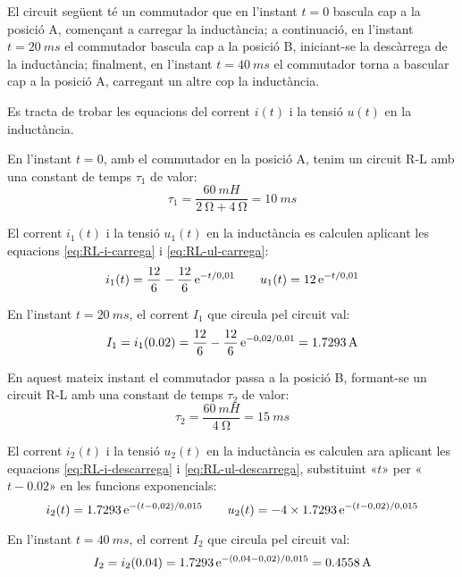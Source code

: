\break
\begin{exemple}\label{ex:carrega-descarrega-RL}
    El circuit següent té un commutador que en l'instant $t=0$ bascula cap a la posició A, començant a carregar la inductància; a continuació, en l'instant $t=\SI{20}{ms}$ el commutador bascula cap a la posició B, iniciant-se la descàrrega de la inductància; finalment, en  l'instant $t=\SI{40}{ms}$ el commutador torna a  bascular cap a la posició A, carregant un altre cop la inductància.

    Es tracta de trobar les equacions del corrent $i(t)$ i la tensió $u(t)$ en la inductància.

    \begin{center}
        
    \end{center}

    En l'instant $t=0$, amb el commutador en la posició A, tenim un circuit R-L amb una constant de temps $\tau_1$ de valor:
    \[
        \tau_1 = \frac{\SI{60}{mH}}{\SI{2}{\ohm}+\SI{4}{\ohm}} = \SI{10}{ms}
    \]

    El corrent $i_1(t)$ i la tensió $u_1(t)$ en la inductància es calculen aplicant les equacions \eqref{eq:RL-i-carrega} i \eqref{eq:RL-ul-carrega}:
    \[
        i_1(t) = \frac{12}{6} - \frac{12}{6}\,\mathrm{e}^{-t/0,01} \qquad
        u_1(t) = 12\,\mathrm{e}^{-t/0,01}
    \]

    En l'instant $t=\SI{20}{ms}$, el corrent $I_1$ que circula pel circuit val:
    \[
        I_1 = i_1(\num{0,02}) = \frac{12}{6} - \frac{12}{6}\,\mathrm{e}^{-0,02/0,01} = \SI{1,7293}{A}
    \]

    En aquest mateix instant  el commutador passa a la posició B, formant-se un circuit R-L amb una constant de temps $\tau_2$ de valor:
    \[
        \tau_2 = \frac{\SI{60}{mH}}{\SI{4}{\ohm}} = \SI{15}{ms}
    \]

    El corrent $i_2(t)$ i la tensió $u_2(t)$ en la inductància es calculen ara aplicant les equacions \eqref{eq:RL-i-descarrega} i \eqref{eq:RL-ul-descarrega}, substituint «$t$» per «$t-\num{0,02}$» en les funcions exponencials:
    \[
        i_2(t) = \num{1,7293}\,\mathrm{e}^{-(t-0,02)/0,015} \qquad
        u_2(t) = -4\times\num{1,7293}\,\mathrm{e}^{-(t-0,02)/0,015}
    \]

    En l'instant $t=\SI{40}{ms}$, el corrent $I_2$ que circula pel circuit val:
    \[
        I_2 = i_2(\num{0,04}) = \num{1,7293}\,\mathrm{e}^{-(0,04-0,02)/0,015} = \SI{0,4558}{A}
    \]


\end{exemple}
